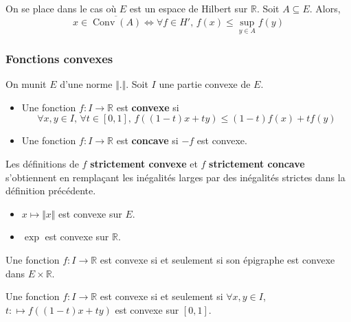   \begin{corollary}
    On se place dans le cas où $E$ est un espace de Hilbert sur $\mathbb{R}$. Soit $A \subseteq E$. Alors,
    \[ x \in \overline{\operatorname{Conv}(A)} \iff \forall f \in H', \, f(x) \leq \sup_{y \in A} f(y) \]
  \end{corollary}

  \subsubsection{Fonctions convexes}

  On munit $E$ d'une norme $\Vert . \Vert$. Soit $I$ une partie convexe de $E$.


  \begin{definition}
    \begin{itemize}
      \item Une fonction $f : I \rightarrow \mathbb{R}$ est \textbf{convexe} si
      \[ \forall x, y \in I, \, \forall t \in [0,1], \, f((1-t)x + ty) \leq (1-t)f(x) + tf(y) \]
      \item Une fonction $f : I \rightarrow \mathbb{R}$ est \textbf{concave} si $-f$ est convexe.
    \end{itemize}
  \end{definition}

  \begin{remark}
    Les définitions de $f$ \textbf{strictement convexe} et $f$ \textbf{strictement concave} s'obtiennent en remplaçant les inégalités larges par des inégalités strictes dans la définition précédente.
  \end{remark}

  \begin{example}
    \begin{itemize}
      \item $x \mapsto \Vert x \Vert$ est convexe sur $E$.
      \item $\exp$ est convexe sur $\mathbb{R}$.
    \end{itemize}
  \end{example}

  \begin{proposition}
    Une fonction $f : I \rightarrow \mathbb{R}$ est convexe si et seulement si son épigraphe est convexe dans $E \times \mathbb{R}$.
  \end{proposition}

  \begin{theorem}
    Une fonction $f : I \rightarrow \mathbb{R}$ est convexe si et seulement si $\forall x, y \in I$, $t : \mapsto f((1-t)x + ty)$ est convexe sur $[0,1]$.
  \end{theorem}

